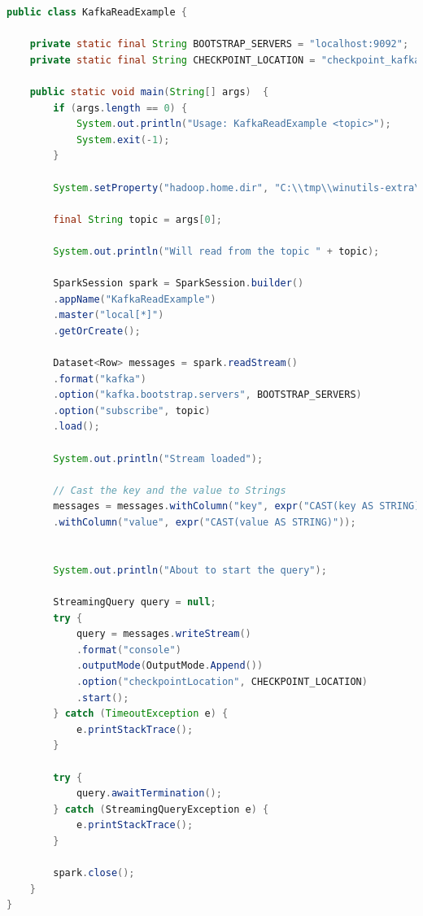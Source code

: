 \documentclass[a4paper,10pt,twoside]{report}
\begin{document}
\begin{lstlisting}[language=Java]
public class KafkaReadExample {
	
	private static final String BOOTSTRAP_SERVERS = "localhost:9092";
	private static final String CHECKPOINT_LOCATION = "checkpoint_kafkareadexample";
	
	public static void main(String[] args)  {
		if (args.length == 0) {
			System.out.println("Usage: KafkaReadExample <topic>");
			System.exit(-1);
		}
		
		System.setProperty("hadoop.home.dir", "C:\\tmp\\winutils-extra\\hadoop");
		
		final String topic = args[0];
		
		System.out.println("Will read from the topic " + topic);
		
		SparkSession spark = SparkSession.builder()
		.appName("KafkaReadExample")				
		.master("local[*]")
		.getOrCreate();
		
		Dataset<Row> messages = spark.readStream()
		.format("kafka")
		.option("kafka.bootstrap.servers", BOOTSTRAP_SERVERS)
		.option("subscribe", topic)
		.load();
		
		System.out.println("Stream loaded");
		
		// Cast the key and the value to Strings
		messages = messages.withColumn("key", expr("CAST(key AS STRING)"))
		.withColumn("value", expr("CAST(value AS STRING)"));
		
		
		System.out.println("About to start the query");
		
		StreamingQuery query = null;
		try {
			query = messages.writeStream()
			.format("console")
			.outputMode(OutputMode.Append())
			.option("checkpointLocation", CHECKPOINT_LOCATION)
			.start();
		} catch (TimeoutException e) {		
			e.printStackTrace();
		}
		
		try {
			query.awaitTermination();
		} catch (StreamingQueryException e) {
			e.printStackTrace();
		}
		
		spark.close();
	}
}
\end{lstlisting}
\end{document}
